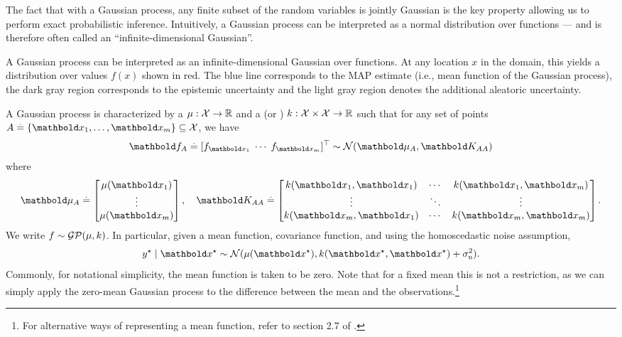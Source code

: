 The fact that with a Gaussian process, any finite subset of the random variables is jointly Gaussian is the key property allowing us to perform exact probabilistic inference.
Intuitively, a Gaussian process can be interpreted as a normal distribution over functions --- and is therefore often called an ``infinite-dimensional Gaussian''.

\begin{marginfigure}
  \caption{A Gaussian process can be interpreted as an infinite-dimensional Gaussian over functions.
  At any location $x$ in the domain, this yields a distribution over values $f(x)$ shown in red.
  The blue line corresponds to the MAP estimate (i.e., mean function of the Gaussian process), the dark gray region corresponds to the epistemic uncertainty and the light gray region denotes the additional aleatoric uncertainty.}
\end{marginfigure}

A Gaussian process is characterized by a  $\mu : \mathcal{X} \to \mathbb{R}$ and a  (or ) $k : \mathcal{X} \times \mathcal{X} \to \mathbb{R}$ such that for any set of points $\sA \defeq \{\vx_1, \dots, \vx_m\} \subseteq \spX$, we have \begin{align}
  \vf_\sA \defeq \transpose{[f_{\vx_1} \; \cdots \; f_{\vx_m}]} \sim \N{\vmu_\sA}{\mK_{\sA\sA}} \label{eq:gp_joint_distr}
\end{align} where \begin{align}
  \vmu_\sA \defeq \begin{bmatrix}
    \mu(\vx_1) \\
    \vdots \\
    \mu(\vx_m) \\
  \end{bmatrix}, \quad \mK_{\sA\sA} \defeq \begin{bmatrix}
    k(\vx_1, \vx_1) & \cdots & k(\vx_1, \vx_m) \\
    \vdots & \ddots & \vdots \\
    k(\vx_m, \vx_1) & \cdots & k(\vx_m, \vx_m) \\
  \end{bmatrix}.
\end{align}
We write $f \sim \GP{\mu}{k}$.
In particular, given a mean function, covariance function, and using the homoscedastic noise assumption, \begin{align}
  \ys \mid \vxs \sim \N{\mu(\vxs)}{k(\vxs, \vxs) + \sigman^2}. \label{eq:gp_predictive_distr}
\end{align}
Commonly, for notational simplicity, the mean function is taken to be zero.
Note that for a fixed mean this is not a restriction, as we can simply apply the zero-mean Gaussian process to the difference between the mean and the observations.\footnote{For alternative ways of representing a mean function, refer to section 2.7 of .}


